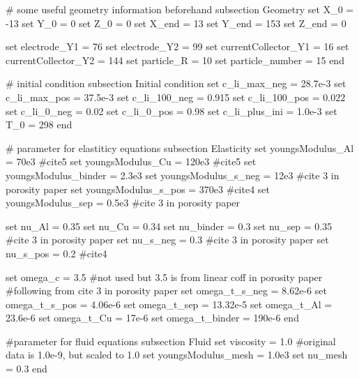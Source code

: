 \begin{DoxyCode}
\textcolor{preprocessor}{# some useful geometry information beforehand}
subsection Geometry
\textcolor{keyword}{set} X\_0 = -13
\textcolor{keyword}{set} Y\_0 = 0
\textcolor{keyword}{set} Z\_0 = 0
\textcolor{keyword}{set} X\_end = 13 
\textcolor{keyword}{set} Y\_end = 153
\textcolor{keyword}{set} Z\_end = 0

\textcolor{keyword}{set} electrode\_Y1 = 76
\textcolor{keyword}{set} electrode\_Y2 = 99
\textcolor{keyword}{set} currentCollector\_Y1 = 16
\textcolor{keyword}{set} currentCollector\_Y2 = 144
\textcolor{keyword}{set} particle\_R = 10
\textcolor{keyword}{set} particle\_number = 15
end

\textcolor{preprocessor}{# initial condition}
subsection Initial condition
\textcolor{keyword}{set} c\_li\_max\_neg = 28.7e-3
\textcolor{keyword}{set} c\_li\_max\_pos = 37.5e-3
\textcolor{keyword}{set} c\_li\_100\_neg = 0.915
set c\_li\_100\_pos = 0.022
set c\_li\_0\_neg = 0.02
set c\_li\_0\_pos = 0.98
set c\_li\_plus\_ini = 1.0e-3
\textcolor{keyword}{set} T\_0 = 298
end

\textcolor{preprocessor}{# parameter for elastiticy equations}
subsection Elasticity
\textcolor{keyword}{set} youngsModulus\_Al = 70e3 #cite5
\textcolor{keyword}{set} youngsModulus\_Cu = 120e3 #cite5 
\textcolor{keyword}{set} youngsModulus\_binder = 2.3e3
\textcolor{keyword}{set} youngsModulus\_s\_neg = 12e3 #cite 3 in porosity paper
\textcolor{keyword}{set} youngsModulus\_s\_pos = 370e3 #cite4
\textcolor{keyword}{set} youngsModulus\_sep = 0.5e3 #cite 3 in porosity paper

\textcolor{keyword}{set} nu\_Al = 0.35
set nu\_Cu = 0.34
set nu\_binder = 0.3 
\textcolor{keyword}{set} nu\_sep = 0.35 #cite 3 in porosity paper
\textcolor{keyword}{set} nu\_s\_neg = 0.3 #cite 3 in porosity paper
\textcolor{keyword}{set} nu\_s\_pos = 0.2 #cite4 

\textcolor{keyword}{set} omega\_c = 3.5 #not used but 3.5 is from linear coff in porosity paper
\textcolor{preprocessor}{#following from cite 3 in porosity paper}
\textcolor{keyword}{set} omega\_t\_s\_neg = 8.62e-6 
\textcolor{keyword}{set} omega\_t\_s\_pos = 4.06e-6
\textcolor{keyword}{set} omega\_t\_sep = 13.32e-5
\textcolor{keyword}{set} omega\_t\_Al = 23.6e-6
\textcolor{keyword}{set} omega\_t\_Cu = 17e-6
\textcolor{keyword}{set} omega\_t\_binder = 190e-6 
end

\textcolor{preprocessor}{#parameter for fluid equations}
subsection Fluid
\textcolor{keyword}{set} viscosity = 1.0 #original data is 1.0e-9, but scaled to 1.0
set youngsModulus\_mesh = 1.0e3
\textcolor{keyword}{set} nu\_mesh = 0.3
end


\end{DoxyCode}

